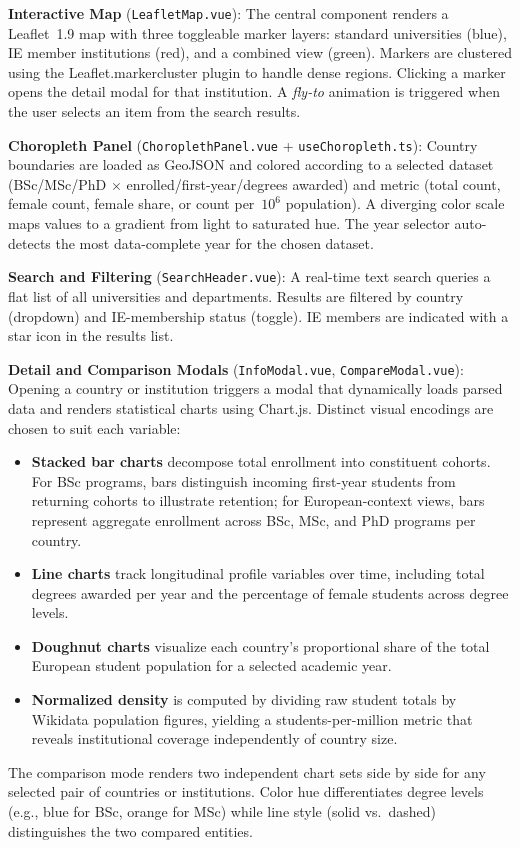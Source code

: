 \documentclass[final,3p,times,twocolumn]{elsarticle}
\begin{document}
\textbf{Interactive Map} (\texttt{LeafletMap.vue}): The central component renders a Leaflet~1.9 map with three toggleable marker layers: standard universities (blue), IE member institutions (red), and a combined view (green). Markers are clustered using the Leaflet.markercluster plugin to handle dense regions. Clicking a marker opens the detail modal for that institution. A \textit{fly-to} animation is triggered when the user selects an item from the search results.

\textbf{Choropleth Panel} (\texttt{ChoroplethPanel.vue} + \texttt{useChoropleth.ts}): Country boundaries are loaded as GeoJSON and colored according to a selected dataset (BSc/MSc/PhD $\times$ enrolled/first-year/degrees awarded) and metric (total count, female count, female share, or count per~$10^6$ population). A diverging color scale maps values to a gradient from light to saturated hue. The year selector auto-detects the most data-complete year for the chosen dataset.

\textbf{Search and Filtering} (\texttt{SearchHeader.vue}): A real-time text search queries a flat list of all universities and departments. Results are filtered by country (dropdown) and IE-membership status (toggle). IE members are indicated with a star icon in the results list.

\textbf{Detail and Comparison Modals} (\texttt{InfoModal.vue}, \texttt{CompareModal.vue}): Opening a country or institution triggers a modal that dynamically loads parsed data and renders statistical charts using Chart.js. Distinct visual encodings are chosen to suit each variable:
\begin{itemize}
    \item \textbf{Stacked bar charts} decompose total enrollment into constituent cohorts. For BSc programs, bars distinguish incoming first-year students from returning cohorts to illustrate retention; for European-context views, bars represent aggregate enrollment across BSc, MSc, and PhD programs per country.
    \item \textbf{Line charts} track longitudinal profile variables over time, including total degrees awarded per year and the percentage of female students across degree levels.
    \item \textbf{Doughnut charts} visualize each country's proportional share of the total European student population for a selected academic year.
    \item \textbf{Normalized density} is computed by dividing raw student totals by Wikidata population figures, yielding a students-per-million metric that reveals institutional coverage independently of country size.
\end{itemize}
The comparison mode renders two independent chart sets side by side for any selected pair of countries or institutions. Color hue differentiates degree levels (e.g., blue for BSc, orange for MSc) while line style (solid vs.\ dashed) distinguishes the two compared entities.
\end{document}
